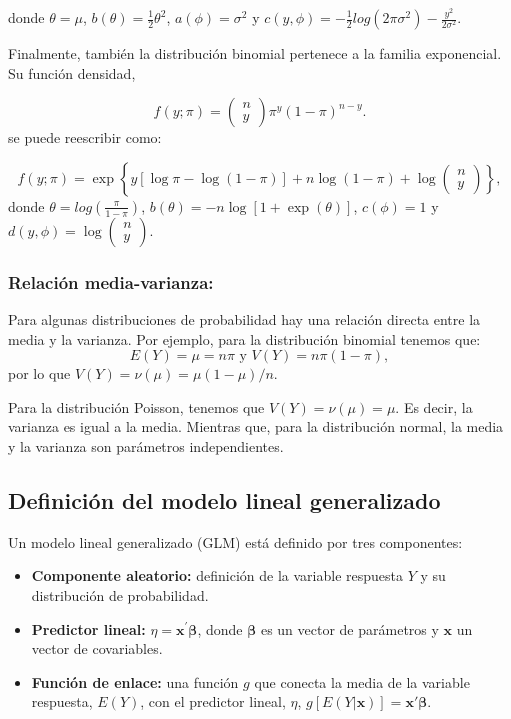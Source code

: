 \documentclass[
]{article}
\begin{document}
donde \(\theta=\mu\), \(b(\theta)=\frac{1}{2}\theta^2\), \(a(\phi)=\sigma^2\) y \(c(y,\phi)=-\frac{1}{2}log(2\pi\sigma^2)-\frac{y^2}{2\sigma^2}\).

Finalmente, también la distribución binomial pertenece a la familia exponencial. Su función densidad,

\[
f(y;\pi)=\left(\begin{array}{c}n\\y\end{array}\right)\pi^y(1-\pi)^{n-y}.
\]
se puede reescribir como:

\[
f(y;\pi)=\exp\left\{y[\log\pi-\log(1-\pi)]+n\log(1-\pi)+\log\left(\begin{array}{c}n\\y\end{array}\right)\right\},
\]
donde \(\theta=log\left(\frac{\pi}{1-\pi}\right)\), \(b(\theta)=-n\log\left[1+\exp(\theta)\right]\), \(c(\phi)=1\) y \(d(y,\phi)=\log\left(\begin{array}{c}n\\y\end{array}\right)\).

\subsubsection{Relación media-varianza:}\label{relaciuxf3n-media-varianza}

Para algunas distribuciones de probabilidad hay una relación directa entre la media y la varianza. Por ejemplo, para la distribución binomial tenemos que:
\[
E(Y) = \mu = n\pi \mbox{ y } V(Y) =  n\pi(1-\pi),
\]
por lo que \(V(Y) = \nu(\mu) = \mu(1-\mu)/n\).

Para la distribución Poisson, tenemos que \(V(Y) = \nu(\mu) = \mu\). Es decir, la varianza es igual a la media. Mientras que, para la distribución normal, la media y la varianza son parámetros independientes.

\subsection{Definición del modelo lineal generalizado}\label{definiciuxf3n-del-modelo-lineal-generalizado}

Un modelo lineal generalizado (GLM) está definido por tres componentes:

\begin{itemize}
\item
  \textbf{Componente aleatorio:} definición de la variable respuesta \(Y\) y su distribución de probabilidad.
\item
  \textbf{Predictor lineal:} \(\eta=\boldsymbol x^{'}\boldsymbol \beta\), donde \(\boldsymbol \beta\) es un vector de parámetros y \(\boldsymbol x\) un vector de covariables.
\item
  \textbf{Función de enlace:} una función \(g\) que conecta la media de la variable respuesta, \(E(Y)\), con el predictor lineal, \(\eta\), \(g[E(Y|\boldsymbol x)]=\boldsymbol x'\boldsymbol \beta\).
\end{itemize}
\end{document}
